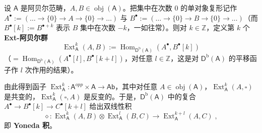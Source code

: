 \begin{Def}\label{def:7.20}
设 $\mathsf A$ 是阿贝尔范畴，$A,B\in\operatorname{obj}(\mathsf A)$。把集中在次数 $0$ 的单对象复形记作 $A^\bullet:=(\dots\to\{0\}\to A\to\{0\}\to\dots)$ 与 $B^\bullet:=(\dots\to\{0\}\to B\to\{0\}\to\dots)$（而 $B^\bullet[k]:=B^{\bullet+k}$ 表示 $B$ 集中在次数 $-k$，一如往常）。则对 $k\in\mathbb Z$，定义第 $k$ 个 \textbf{Ext-阿贝尔群}
\begin{equation}\label{eq:7.109}
\operatorname{Ext}^k_{\mathsf A}(A,B):=\operatorname{Hom}_{\mathsf D^{\mathrm b}(\mathsf A)}(A^\bullet,B^\bullet[k])
\end{equation}
（$=\operatorname{Hom}_{\mathsf D^{\mathrm b}(\mathsf A)}(A^\bullet[l],B^\bullet[k+l])$，对任意 $l\in\mathbb Z$，这是对 $\mathsf D^{\mathrm b}(\mathsf A)$ 的平移函子作 $l$ 次作用的结果）。

由此得到函子 $\operatorname{Ext}^k_{\mathsf A}:\mathsf A^{opp}\times\mathsf A\to\mathsf{Ab}$，其中对任意 $A\in\operatorname{obj}(\mathsf A)$，$\operatorname{Ext}^k_{\mathsf A}(A,\square)$ 是共变的，$\operatorname{Ext}^k_{\mathsf A}(\square,A)$ 是反变的。于是，$\mathsf D^{\mathrm b}(\mathsf A)$ 中的复合 $A^\bullet\to B^\bullet[k]\to C^\bullet[k+l]$ 给出双线性积
\begin{equation}\label{eq:7.110}
\diamond:\operatorname{Ext}^k_{\mathsf A}(A,B)\otimes\operatorname{Ext}^l_{\mathsf A}(B,C)\to\operatorname{Ext}^{k+l}_{\mathsf A}(A,C)\;,
\end{equation}
即 \textbf{Yoneda 积}。
\end{Def}

